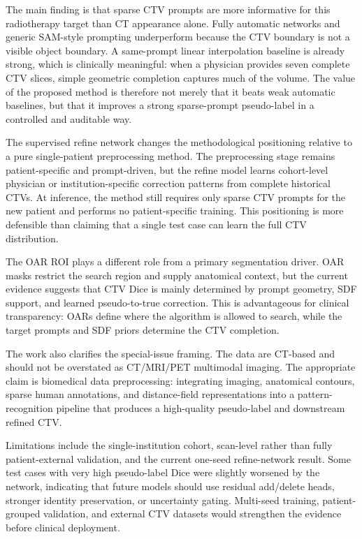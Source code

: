 \documentclass[preprint,12pt]{elsarticle}
\begin{document}
The main finding is that sparse CTV prompts are more informative for this radiotherapy target than CT appearance alone. Fully automatic networks and generic SAM-style prompting underperform because the CTV boundary is not a visible object boundary. A same-prompt linear interpolation baseline is already strong, which is clinically meaningful: when a physician provides seven complete CTV slices, simple geometric completion captures much of the volume. The value of the proposed method is therefore not merely that it beats weak automatic baselines, but that it improves a strong sparse-prompt pseudo-label in a controlled and auditable way.

The supervised refine network changes the methodological positioning relative to a pure single-patient preprocessing method. The preprocessing stage remains patient-specific and prompt-driven, but the refine model learns cohort-level physician or institution-specific correction patterns from complete historical CTVs. At inference, the method still requires only sparse CTV prompts for the new patient and performs no patient-specific training. This positioning is more defensible than claiming that a single test case can learn the full CTV distribution.

The OAR ROI plays a different role from a primary segmentation driver. OAR masks restrict the search region and supply anatomical context, but the current evidence suggests that CTV Dice is mainly determined by prompt geometry, SDF support, and learned pseudo-to-true correction. This is advantageous for clinical transparency: OARs define where the algorithm is allowed to search, while the target prompts and SDF priors determine the CTV completion.

The work also clarifies the special-issue framing. The data are CT-based and should not be overstated as CT/MRI/PET multimodal imaging. The appropriate claim is biomedical data preprocessing: integrating imaging, anatomical contours, sparse human annotations, and distance-field representations into a pattern-recognition pipeline that produces a high-quality pseudo-label and downstream refined CTV.

Limitations include the single-institution cohort, scan-level rather than fully patient-external validation, and the current one-seed refine-network result. Some test cases with very high pseudo-label Dice were slightly worsened by the network, indicating that future models should use residual add/delete heads, stronger identity preservation, or uncertainty gating. Multi-seed training, patient-grouped validation, and external CTV datasets would strengthen the evidence before clinical deployment.
\end{document}
